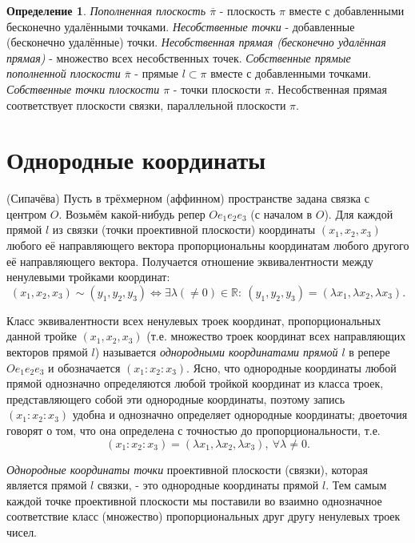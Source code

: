 \documentclass[a4paper, 12pt]{article}
\theoremstyle{definition}
\newtheorem*{definition}{Определение}
\begin{document}
\begin{definition}
    \textit{Пополненная плоскость $\overline{\pi}$} - плоскость $\pi$ вместе с добавленными бесконечно удалёнными точками. \newline 
    \textit{Несобственные точки} - добавленные (бесконечно удалённые) точки. \newline
    \textit{Несобственная прямая (бесконечно удалённая прямая)} - множество всех несобственных точек. \newline
    \textit{Собственные прямые пополненной плоскости $\overline{\pi}$} - прямые $l \subset \pi$ вместе с добавленными точками. \newline
    \textit{Собственные точки плоскости $\pi$} - точки плоскости $\pi$. Несобственная прямая соответствует плоскости связки, параллельной плоскости $\pi$.
\end{definition}


\section{Однородные координаты}
(Сипачёва) Пусть в трёхмерном (аффинном) пространстве задана связка с центром $O$.
Возьмём какой-нибудь репер $Oe_1e_2e_3$ (с началом в $O$). Для каждой прямой $l$ из связки (точки проективной плоскости) координаты $(x_1, x_2, x_3)$ любого её направляющего вектора пропорциональны координатам любого другого её направляющего вектора.
Получается отношение эквивалентности между ненулевыми тройками координат: \[(x_1, x_2, x_3) \sim (y_1, y_2, y_3) \Leftrightarrow \exists \lambda (\neq 0) \in \mathbb{R}: \ (y_1, y_2, y_3) = (\lambda x_1, \lambda x_2, \lambda x_3). \]

Класс эквивалентности всех ненулевых троек координат, пропорциональных данной тройке $(x_1, x_2, x_3)$ (т.е. множество троек координат всех направляющих векторов прямой $l$) называется \textit{однородными координатами прямой $l$} в репере $Oe_1e_2e_3$ и обозначается $(x_1:x_2:x_3)$. Ясно, что однородные координаты любой прямой однозначно определяются любой тройкой координат из класса троек, представляющего собой эти однородные координаты, поэтому запись $(x_1:x_2:x_3)$ удобна и однозначно определяет однородные координаты; двоеточия говорят о том, что она определена с точностью до пропорциональности, т.е. 
\[ (x_1:x_2:x_3) =  (\lambda x_1, \lambda x_2, \lambda x_3), \ \forall \lambda \neq 0.\]

\textit{Однородные координаты точки} проективной плоскости (связки), которая является прямой $l$ связки, - это однородные координаты прямой $l$. Тем самым каждой точке проективной плоскости мы поставили во взаимно однозначное соответствие класс (множество) пропорциональных друг другу ненулевых троек чисел.
\end{document}
